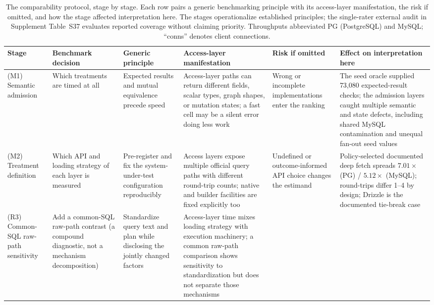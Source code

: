 \begin{table}[htbp]
  \centering
  \caption{The comparability protocol, stage by stage. Each row pairs a generic benchmarking principle with its access-layer manifestation, the risk if omitted, and how the stage affected interpretation here. The stages operationalize established principles; the single-rater external audit in Supplement Table~S37 evaluates reported coverage without claiming priority. Throughputs abbreviated PG (PostgreSQL) and MySQL; ``conns'' denotes client connections.}
  \label{tab:protocol_mapping}
  \begin{adjustbox}{max width=\textwidth,max totalheight=0.72\textheight,keepaspectratio}
  \footnotesize
  \begin{tabular}{p{1.7cm} p{2.3cm} p{2.5cm} p{3.3cm} p{2.5cm} p{3.4cm}}
    \toprule
    \textbf{Stage} & \textbf{Benchmark decision} & \textbf{Generic principle} & \textbf{Access-layer manifestation} & \textbf{Risk if omitted} & \textbf{Effect on interpretation here} \\
    \midrule
    (M1) Semantic admission &
    Which treatments are timed at all &
    Expected results and mutual equivalence precede speed &
    Access-layer paths can return different fields, scalar types, graph shapes, or mutation states; a fast cell may be a silent error doing less work &
    Wrong or incomplete implementations enter the ranking &
    The seed oracle supplied 73,080 expected-result checks; the admission layers caught multiple semantic and state defects, including shared MySQL contamination and unequal fan-out seed values \\
    \addlinespace
    (M2) Treatment definition &
    Which API and loading strategy of each layer is measured &
    Pre-register and fix the system-under-test configuration reproducibly &
    Access layers expose multiple official query paths with different round-trip counts; native and builder facilities are fixed explicitly too &
    Undefined or outcome-informed API choice changes the estimand &
    Policy-selected documented deep fetch spreads $7.01\times$ (PG) / $5.12\times$ (MySQL); round-trips differ 1--4 by design; Drizzle is the documented tie-break case \\
    \addlinespace
    (R3) Common-SQL raw-path sensitivity &
    Add a common-SQL raw-path contrast (a compound diagnostic, not a mechanism decomposition) &
    Standardize query text and plan while disclosing the jointly changed factors &
    Access-layer time mixes loading strategy with execution machinery; a common raw-path comparison shows sensitivity to standardization but does not separate those mechanisms &

\end{tabular}
\end{adjustbox}
\end{table}
